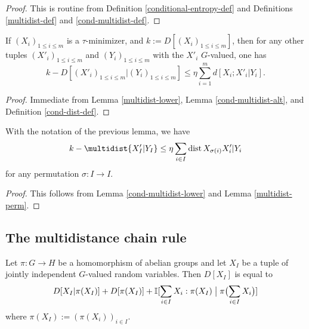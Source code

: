 \begin{proof}
  This is routine from Definition \ref{conditional-entropy-def} and Definitions \ref{multidist-def} and \ref{cond-multidist-def}.
\end{proof}

\begin{lemma}\label{cond-multidist-lower}  If  $(X_i)_{1 \leq i \leq m}$ is a $\tau$-minimizer, and $k := D[(X_i)_{1 \leq i \leq m}]$, then for any other tuples $(X'_i)_{1 \leq i \leq m}$ and $(Y_i)_{1 \leq i \leq m}$ with the $X'_i$ $G$-valued, one has
  $$ k - D[(X'_i)_{1 \leq i \leq m} | (Y_i)_{1 \leq i \leq m}] \leq \eta \sum_{i=1}^m d[X_i; X'_i|Y_i].$$
\end{lemma}

\begin{proof}
  Immediate from Lemma \ref{multidist-lower}, Lemma \ref{cond-multidist-alt}, and Definition \ref{cond-dist-def}.
\end{proof}

\begin{corollary}\label{cond-multidist-lower-II} With the notation of the previous lemma, we have
  \begin{equation}\label{5.3-conv}
    k - \multidist{ X'_{I} | Y_{I} } \leq \eta \sum_{i \in I} \dist{X_{\sigma(i)}}{X'_i|Y_i}
  \end{equation}
for any permutation $\sigma : I \rightarrow I$.
\end{corollary}

\begin{proof}  This follows from Lemma \ref{cond-multidist-lower} and Lemma \ref{multidist-perm}.
\end{proof}

\subsection{The multidistance chain rule}

\begin{lemma}\label{multidist-chain-rule}  Let $\pi \colon G \to H$ be a homomorphism of abelian groups and let $X_{I}$ be a tuple of jointly independent $G$-valued random variables.  Then $D[X_{I}]$ is equal to
  \begin{equation}
      D[ X_{I} | \pi(X_{I}) ]  +D[ \pi(X_{I}) ]  + \mathbb{I}[ \sum_{i \in I} X_i  : \pi(X_{I}) \; \big| \; \pi\bigl(\sum_{i \in I} X_i\bigr) ]
    \label{chain-eq}
  \end{equation}
  where $\pi(X_I) := (\pi(X_i))_{i \in I}$.
  \end{lemma}

